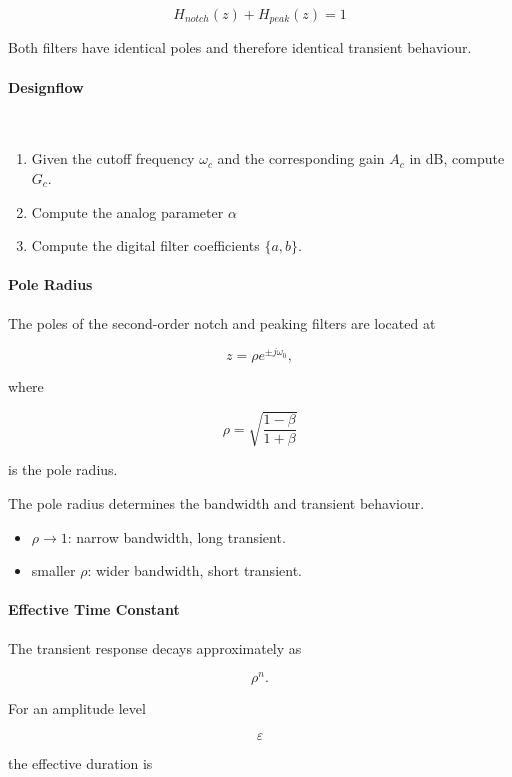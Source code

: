 \[
\boxed{
H_{notch}(z)
+
H_{peak}(z)
=
1
}
\]

Both filters have identical poles and therefore identical transient
behaviour.
\paragraph{Designflow} ~\\
\begin{enumerate}
	\item Given the cutoff frequency $\omega_c$ and the corresponding gain $A_c$ in dB, compute $G_c$.
	\item Compute the analog parameter $\alpha$
	\item Compute the digital filter coefficients $\{a,b\}$.
\end{enumerate}

\paragraph{Pole Radius}

The poles of the second-order notch and peaking filters are located at

\[
z=\rho e^{\pm j\omega_0},
\]

where

\[
\boxed{
\rho=
\sqrt{\frac{1-\beta}{1+\beta}}
}
\]

is the pole radius.

The pole radius determines the bandwidth and transient behaviour.

\begin{itemize}
\item $\rho\rightarrow1$:
      narrow bandwidth,
      long transient.
\item smaller $\rho$:
      wider bandwidth,
      short transient.
\end{itemize}

\paragraph{Effective Time Constant}

The transient response decays approximately as

\[
\rho^n.
\]

For an amplitude level

\[
\varepsilon
\]

the effective duration is

